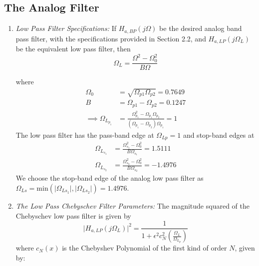 \documentclass{article}
\begin{document}
\subsection{The Analog Filter}
\begin{enumerate}

\item {\em Low Pass Filter Specifications:}  If $H_{a, BP}(j\Omega)$ be the desired analog band
pass filter,  with the specifications provided in Section 2.2, and $H_{a,LP}(j\Omega_L)$ 
be the equivalent low pass filter, then
\begin{equation}
\label{transition}
\Omega_L = \frac{\Omega^2 - \Omega_0^2}{B\Omega}
\end{equation}

where 
\begin{align*}
\Omega_0 &= \sqrt{\Omega_{p1}\Omega_{p2}} = 0.7649\\
B &= \Omega_{p1} - \Omega_{p2} = 0.1247\\
\implies \Omega_{L_{p_1}} &= \frac{\Omega_{p_1}^2 - \Omega_{p_1}\Omega_{p_2}}{(\Omega_{p_1} - \Omega_{p_2})\Omega_{p_1}} = 1
\end{align*}
The low pass filter has
the pass-band edge at $\Omega_{Lp} = 1$ and stop-band edges at 
\begin{align*}
    \Omega_{L_{s_1}} &= \frac{\Omega_{s_1}^2 - \Omega_0^2}{B\Omega_{s_1}} =  1.5111\\
    \Omega_{L_{s_2}} &= \frac{\Omega_{s_2}^2 - \Omega_0^2}{B\Omega_{s_2}} = -1.4976
\end{align*}
We choose the stop-band edge of the analog low pass filter as $\Omega_{Ls} = \mbox{min}(\vert \Omega_{Ls_1}\vert,\vert \Omega_{Ls_2}\vert) = 1.4976$.

\item {\em The Low Pass Chebyschev Filter Parameters:}  The magnitude squared of the Chebyschev low pass filter is given by 
\begin{equation}
\label{lpfirst}
\vert H_{a,LP}(j\Omega_L)\vert^2 = \frac{1}{1 + \epsilon^2c_N^2\left(\frac{\Omega_L}{\Omega_{L_p}}\right)}
\end{equation}
where $c_N(x)$ is the Chebyshev Polynomial of the first kind of order $N$, given by:


\end{enumerate}
\end{document}

